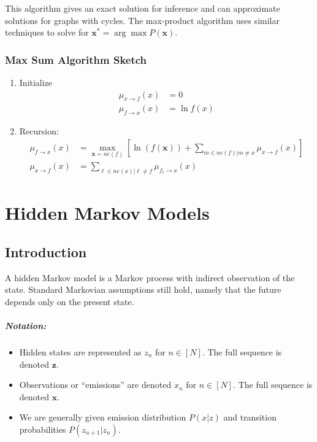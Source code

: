 \documentclass[a4paper,12pt]{report}
\begin{document}
This algorithm gives an exact solution for inference and can approximate solutions for graphs with cycles. The max-product algorithm uses similar techniques to solve for $\pmb x^* = \arg\max P(\pmb x)$.

\subsection{Max Sum Algorithm Sketch}

\begin{enumerate}
\item Initialize 
\begin{equation}
\begin{split}
\mu_{x\to f}(x) &= 0 \\
\mu_{f\to x}(x) &= \ln f(x)
\end{split}
\end{equation}

\item Recursion: 
\begin{equation}
\begin{split}
\mu_{f\to x}(x) &= \max_{\pmb x = ne(f)}[\ln(f(\pmb x)) + \sum_{m\in ne(f) | m \neq x}^{} \mu_{x\to f} (x) ] \\
\mu_{x\to f}(x) &= \sum_{\ell \in ne(x) | \ell \neq f}^{} \mu_{f_\ell \to x}(x)
\end{split}
\end{equation}
\end{enumerate}




\chapter{Hidden Markov Models}

\section{Introduction}

A hidden Markov model is a Markov process with indirect observation of the state. Standard Markovian assumptions still hold, namely that the future depends only on the present state.

\paragraph{Notation: } 
\begin{itemize}
\item Hidden states are represented as $z_n$ for $n\in [N]$. The full sequence is denoted $\pmb z$.
\item Observations or ``emissions'' are denoted $x_n$ for $n\in [N]$. The full sequence is denoted $\pmb x$.
\item We are generally given emission distribution $P(x | z)$ and transition probabilities $P(z_{n+1} | z_n)$.
\end{itemize}
\end{document}

